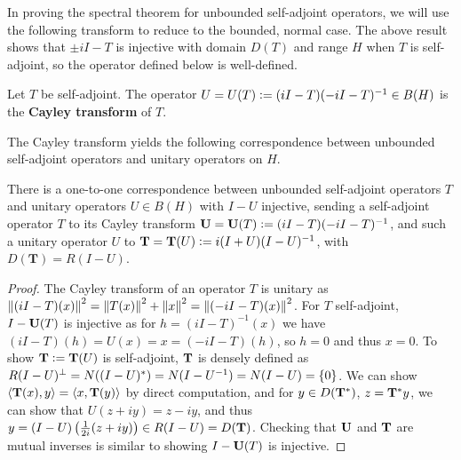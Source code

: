 \documentclass[10pt]{amsart}
\begin{document}
In proving the spectral theorem for unbounded self-adjoint operators, we will use the following transform to reduce to the bounded, normal case. The above result shows that $\pm iI - T$ is injective with domain $D(T)$ and range $H$ when $T$ is self-adjoint, so the operator defined below is well-defined.
\begin{definition}
    Let $T$ be self-adjoint. The operator $U = U(T) \vcentcolon= (iI - T)(-iI - T)^{-1} \in B(H)$ is the \textbf{Cayley transform} of $T$.
\end{definition}
The Cayley transform yields the following correspondence between unbounded self-adjoint operators and unitary operators on $H$.
\begin{proposition}\label{corresp}
    There is a one-to-one correspondence between unbounded self-adjoint operators $T$ and unitary operators $U \in B(H)$ with $I - U$ injective, sending a self-adjoint operator $T$ to its Cayley transform $\mathbf U = \mathbf U(T) \vcentcolon= (iI - T)(-iI - T)^{-1}$, and such a unitary operator $U$ to $\mathbf T = \mathbf T(U) \vcentcolon= i(I + U)(I - U)^{-1}$, with $D(\mathbf T) = R(I - U)$.
\end{proposition}
\begin{proof}
    The Cayley transform of an operator $T$ is unitary as $\left\| (iI - T)(x) \right\|^2 = \left\| T(x) \right\|^2 + \left\| x \right\|^2 = \left\| (-iI - T)(x) \right\|^2$. For $T$ self-adjoint, $I - \mathbf{U}(T)$ is injective as for $h = (iI - T)^{-1}(x)$ we have $(iI - T)(h) = U(x) = x = (-iI - T)(h)$, so $h = 0$ and thus $x = 0$. To show $\mathbf{T} \vcentcolon= \mathbf{T}(U)$ is self-adjoint, $\mathbf{T}$ is densely defined as $R(I - U)^\perp = N((I - U)^*) = N(I - U^{-1}) = N(I - U) = \left\{  0  \right\}$. We can show $\left\langle \mathbf{T}(x), y \right\rangle = \left\langle x, \mathbf{T}(y) \right\rangle$ by direct computation, and for $y \in D(\mathbf{T}^*)$, $z = \mathbf{T}^*y$, we can show that $U(z + iy) = z - iy$, and thus $y = (I - U)\left(  \frac1{2i}(z + iy)  \right) \in R(I - U) = D(\mathbf{T})$. Checking that $\mathbf{U}$ and $\mathbf{T}$ are mutual inverses is similar to showing $I - \mathbf{U}(T)$ is injective.
\end{proof}
\end{document}
